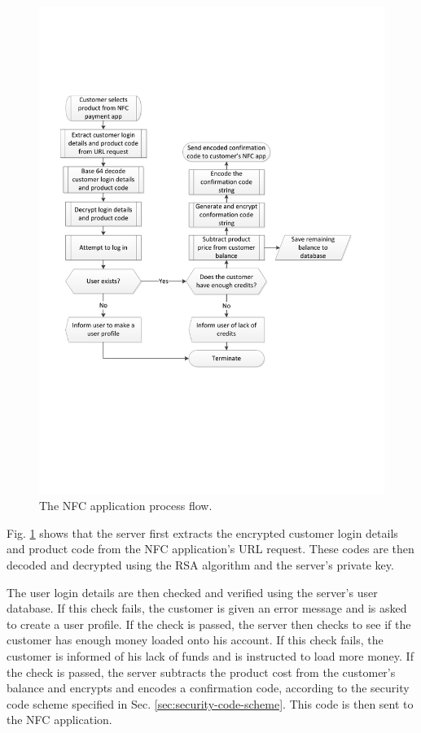 \begin{figure}
 \centering 
 \includegraphics[clip=true, trim = 0 220 50 150,
 scale=0.7]{nfc_processflow_bak}
 \caption{The NFC application process flow.}
 \label{fig:nfc-process}
\end{figure}

Fig. \ref{fig:nfc-process} shows that the server first extracts the encrypted
customer login details and product code from the NFC application's URL request. These
codes are then decoded and decrypted using the RSA algorithm and the server's private key.

The user login details are then checked and verified using the server's user database. If this
check fails, the customer is given an error message and is asked to create a user profile.
If the check is passed, the server then checks to see if the customer has enough money
loaded onto his account. If this check fails, the customer is informed of his lack of
funds and is instructed to load more money. If the check is passed, the server subtracts
the product cost from the customer's balance and encrypts and encodes a confirmation
code, according to the security code scheme specified in Sec.
\ref{sec:security-code-scheme}. This code is then sent to the NFC application.

